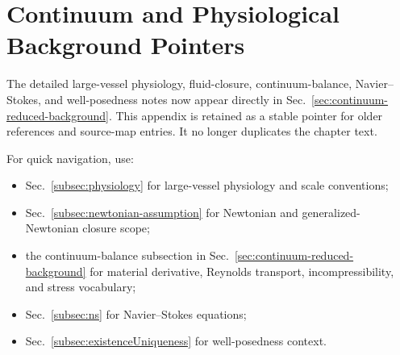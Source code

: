 \section{Continuum and Physiological Background Pointers}
\label{app:continuum-physiology-background}

The detailed large-vessel physiology, fluid-closure, continuum-balance,
Navier--Stokes, and well-posedness notes now appear directly in
Sec.~\ref{sec:continuum-reduced-background}. This appendix is retained as a
stable pointer for older references and source-map entries. It no longer
duplicates the chapter text.

For quick navigation, use:
\begin{itemize}
    \item Sec.~\ref{subsec:physiology} for large-vessel physiology and scale
    conventions;
    \item Sec.~\ref{subsec:newtonian-assumption} for Newtonian and
    generalized-Newtonian closure scope;
    \item the continuum-balance subsection in
    Sec.~\ref{sec:continuum-reduced-background} for material derivative,
    Reynolds transport, incompressibility, and stress vocabulary;
    \item Sec.~\ref{subsec:ns} for Navier--Stokes equations;
    \item Sec.~\ref{subsec:existenceUniqueness} for well-posedness context.
\end{itemize}
